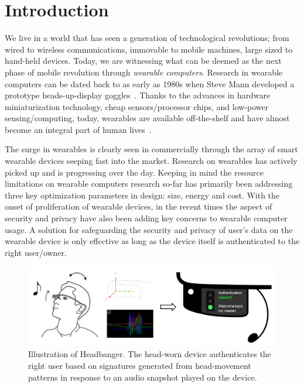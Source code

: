 \section{Introduction}\label{sec:intro}

We live in a world that has seen a generation of technological revolutions;
from wired to wireless communications, immovable to mobile machines, large
sized to hand-held devices. Today, we are witnessing what can be deemed as the
next phase of mobile revolution through {\em wearable computers}. Research in
wearable computers can be dated back to as early as 1980s when Steve Mann
developed a prototype heads-up-display goggles~\cite{}. Thanks to the 
advances in hardware miniaturization technology, cheap sensors/processor 
chips, and low-power sensing/computing, today, wearables are available 
off-the-shelf and have almost become an integral part of human 
lives~\cite{googleglass,smart-watch, fitbit}. 

The surge in wearables is clearly seen in commercially through the array of 
smart wearable devices seeping fast into the market. Research on wearables has 
actively picked up and is progressing over the day. Keeping in mind the 
resource limitations on wearable computers research so-far has primarily 
been addressing three key optimization parameters in 
design: size, energy and cost. With the onset of proliferation of wearable 
devices, in the recent times the aspect of security and privacy have also been 
adding key concerns to wearable computer usage.
A solution for safeguarding the security and privacy of user's data on the 
wearable device is only effective as long as the device itself is 
authenticated to the right user/owner.

\begin{figure}
\centering
\includegraphics[width=\columnwidth]{fig/headbanger-illustrate.png}
\caption{Illustration of Headbanger. The head-worn device authenticates the
right user based on signatures generated from head-movement patterns in 
response to an audio snapshot played on the device.}
\label{fig:headbanger-illustrate}
\end{figure}


